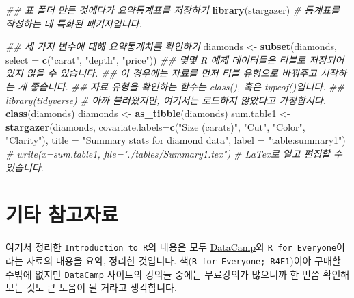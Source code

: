 \documentclass[]{book}
\newenvironment{Shaded}{\begin{snugshade}}{\end{snugshade}}
\newcommand{\CommentTok}[1]{\textcolor[rgb]{0.56,0.35,0.01}{\textit{#1}}}
\newcommand{\DataTypeTok}[1]{\textcolor[rgb]{0.13,0.29,0.53}{#1}}
\newcommand{\KeywordTok}[1]{\textcolor[rgb]{0.13,0.29,0.53}{\textbf{#1}}}
\newcommand{\NormalTok}[1]{#1}
\newcommand{\StringTok}[1]{\textcolor[rgb]{0.31,0.60,0.02}{#1}}
\begin{document}
\begin{Shaded}
\begin{Highlighting}[]
\CommentTok{## 표 폴더 만든 것에다가 요약통계표를 저장하기}
\KeywordTok{library}\NormalTok{(stargazer) }\CommentTok{# 통계표를 작성하는 데 특화된 패키지입니다.}

\CommentTok{## 세 가지 변수에 대해 요약통계치를 확인하기}
\NormalTok{diamonds <-}\StringTok{ }\KeywordTok{subset}\NormalTok{(diamonds, }\DataTypeTok{select =} \KeywordTok{c}\NormalTok{(}\StringTok{"carat"}\NormalTok{, }\StringTok{"depth"}\NormalTok{, }\StringTok{"price"}\NormalTok{))}
\CommentTok{## 몇몇 R 예제 데이터들은 티블로 저장되어 있지 않을 수 있습니다. }
\CommentTok{## 이 경우에는 자료를 먼저 티블 유형으로 바꿔주고 시작하는 게 좋습니다.}
\CommentTok{## 자료 유형을 확인하는 함수는 class(), 혹은 typeof()입니다.}
\CommentTok{## library(tidyverse) # 아까 불러왔지만, 여기서는 로드하지 않았다고 가정합시다.}
\KeywordTok{class}\NormalTok{(diamonds)}
\NormalTok{diamonds <-}\StringTok{ }\KeywordTok{as_tibble}\NormalTok{(diamonds)}
\NormalTok{sum.table1 <-}\StringTok{ }\KeywordTok{stargazer}\NormalTok{(diamonds, }
                      \DataTypeTok{covariate.labels=}\KeywordTok{c}\NormalTok{(}\StringTok{"Size (carats)"}\NormalTok{, }
                                         \StringTok{"Cut"}\NormalTok{, }\StringTok{"Color"}\NormalTok{, }
                                         \StringTok{"Clarity"}\NormalTok{), }
                                         \DataTypeTok{title =} \StringTok{"Summary stats for diamond data"}\NormalTok{, }
                                         \DataTypeTok{label =} \StringTok{"table:summary1"}\NormalTok{)}
\CommentTok{# write(x=sum.table1, file="./tables/Summary1.tex") # LaTex로 열고 편집할 수 있습니다.}
\end{Highlighting}
\end{Shaded}

\hypertarget{uxae30uxd0c0-uxcc38uxace0uxc790uxb8cc}{%
\section{기타 참고자료}\label{uxae30uxd0c0-uxcc38uxace0uxc790uxb8cc}}

여기서 정리한 \texttt{Introduction\ to\ R}의 내용은 모두 \href{https://www.datacamp.com/}{DataCamp}와 \texttt{R\ for\ Everyone}이라는 자료의 내용을 요약, 정리한 것입니다. 책(\texttt{R\ for\ Everyone;\ R4E1})이야 구매할 수밖에 없지만 \texttt{DataCamp} 사이트의 강의들 중에는 무료강의가 많으니까 한 번쯤 확인해보는 것도 큰 도움이 될 거라고 생각합니다.
\end{document}
